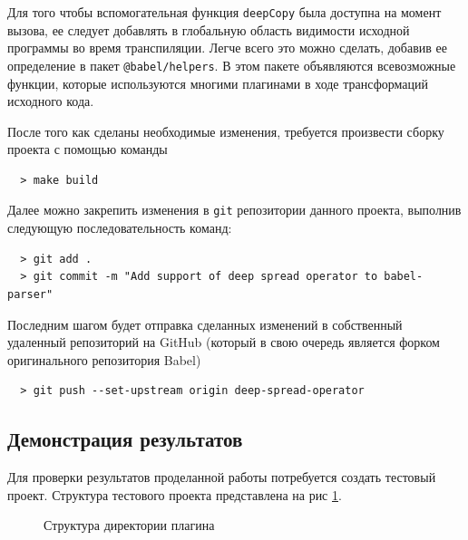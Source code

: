 \documentclass[14pt, a4paper]{article}
\def\code#1{\texttt{#1}} %
\begin{document}



Для того чтобы вспомогательная функция \code{deepCopy} была доступна на момент вызова, ее следует 
добавлять в глобальную область видимости исходной программы во время транспиляции. Легче всего это можно сделать,
добавив ее определение в пакет \code{@babel/helpers}. В этом пакете объявляются всевозможные функции,
которые используются многими плагинами в ходе трансформаций исходного кода.





После того как сделаны необходимые изменения, требуется произвести сборку проекта с помощью команды
\begin{lstlisting}
  > make build
 \end{lstlisting}

Далее можно закрепить изменения в \code{git} репозитории данного проекта, выполнив следующую последовательность команд:
\begin{lstlisting}
  > git add .
  > git commit -m "Add support of deep spread operator to babel-parser"
\end{lstlisting}

Последним шагом будет отправка сделанных изменений в собственный удаленный репозиторий на GitHub (который
в свою очередь является форком оригинального репозитория Babel)
\begin{lstlisting}
  > git push --set-upstream origin deep-spread-operator
\end{lstlisting}
\subsection{Демонстрация результатов}

Для проверки результатов проделанной работы потребуется создать тестовый проект. Структура тестового проекта 
представлена на рис \ref{test_struct}.
\begin{figure}[h!]
  \centering
  \caption{Структура директории плагина}
  \label{test_struct}
\end{figure}
\end{document}
